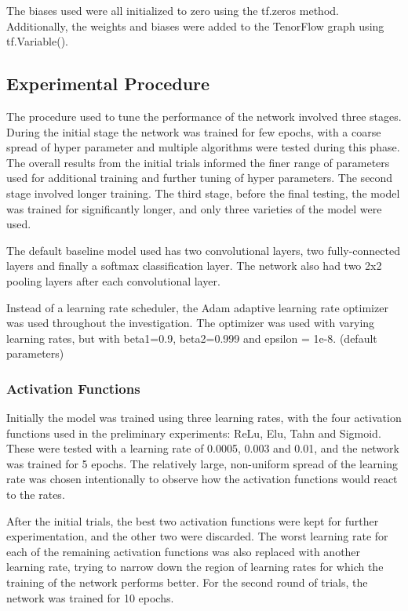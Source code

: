 \documentclass[]{article}
\begin{document}
The biases used were all initialized to zero using the tf.zeros method. Additionally, the weights and biases were added to the TenorFlow graph using  tf.Variable().

\subsection{Experimental Procedure}

The procedure used to tune the performance of the network involved three stages. During the initial stage the network was trained for few epochs, with a coarse spread of hyper parameter and multiple algorithms were tested during this phase. The overall results from the initial trials informed the finer range of parameters used for additional training and further tuning of hyper parameters. The second stage involved longer training. The third stage, before the final testing, the model was trained for significantly longer, and only three varieties of the model were used. 


The default baseline model used has two convolutional layers, two fully-connected layers and finally a softmax classification layer. The network also had two 2x2 pooling layers after each convolutional layer. 

Instead of a learning rate scheduler, the Adam adaptive learning rate optimizer was used throughout the investigation. The optimizer was used with varying learning rates, but with beta1=0.9, beta2=0.999 and epsilon = 1e-8. (default parameters) 


\subsubsection{Activation Functions}

Initially the model was trained using three learning rates, with the four activation functions used in the preliminary experiments: ReLu, Elu, Tahn and Sigmoid. These were tested with a learning rate of 0.0005, 0.003 and 0.01, and the network was trained for 5 epochs. The relatively large, non-uniform spread of the learning rate was chosen intentionally to observe how the activation functions would react to the rates.

After the initial trials, the best two activation functions were kept for further experimentation, and the other two were discarded. The worst learning rate for each of the remaining activation functions was also replaced with another learning rate, trying to narrow down the region of learning rates for which the training of the network performs better. For the second round of trials, the network was trained for 10 epochs. 
\end{document}
